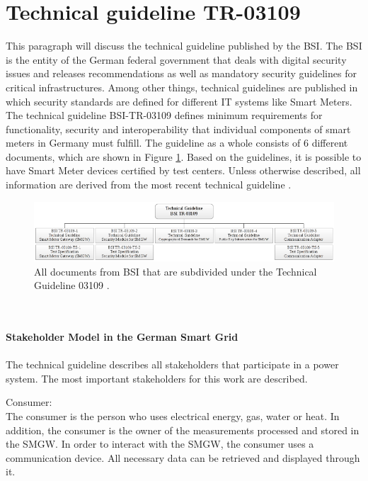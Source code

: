\section{Technical guideline TR-03109}
\label{sec:TR_03109}
This paragraph will discuss the technical guideline published by the BSI. The BSI is the entity of the German federal government that deals with digital security issues and releases recommendations as well as mandatory security guidelines for critical infrastructures. Among other things, technical guidelines are published in which security standards are defined for different IT systems like Smart Meters. The technical guideline BSI-TR-03109 defines minimum requirements for functionality, security and interoperability that individual components of smart meters in Germany must fulfill. The guideline as a whole consists of 6 different documents, which are shown in Figure \ref{fig:TG03109}. Based on the guidelines, it is possible to have Smart Meter devices certified by test centers. Unless otherwise described, all information are derived from the most recent technical guideline \cite{TR-031}.\begin{figure}[tbp]
  \centering
  \includegraphics[width=1\textwidth]{images/BSI-TR-03109.png}
  \caption[Technical Guideline 03109 Overview]{All documents from BSI that are subdivided under the Technical Guideline 03109 \cite{Anna}.}
  \label{fig:TG03109}
\end{figure}
\\%
\\
\textbf{Stakeholder Model in the German Smart Grid}
\label{subsec:stakeholder_model}
\\
\\
The technical guideline describes all stakeholders that participate in a power system. The most important stakeholders for this work are described.
\\\item Consumer: \\
The consumer is the person who uses electrical energy, gas, water
or heat. In addition, the consumer is the owner of the measurements processed and stored in the SMGW. In order to interact with the SMGW, the consumer uses a communication device. All necessary data can be retrieved and displayed through it.\\
